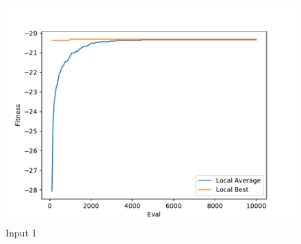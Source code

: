\documentclass{standalone}
\begin{document}
\begin{figure}[!htb]
	\caption{Input 1}
	\label{fig:graph_1033}
	\includegraphics[width=\textwidth]{../graphs/graphs/1033.pdf}
\end{figure}
\end{document}

